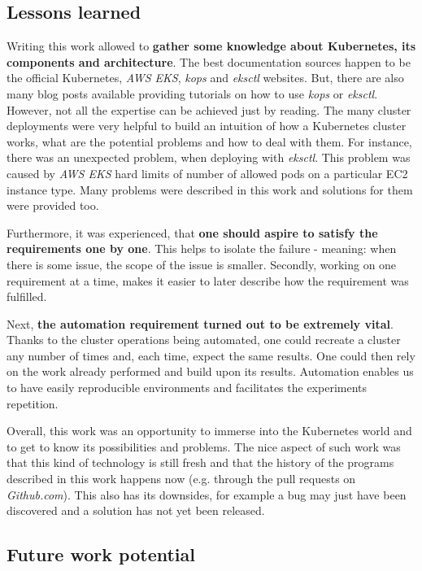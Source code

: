 \subsection{Lessons learned}

Writing this work allowed to \textbf{gather some knowledge about Kubernetes, its components and architecture}. The best documentation sources happen to be the official Kubernetes, \textit{AWS EKS}, \textit{kops} and \textit{eksctl} websites. But, there are also many blog posts available providing tutorials on how to use \textit{kops} or \textit{eksctl}. However, not all the expertise can be achieved just by reading. The many cluster deployments were very helpful to build an intuition of how a Kubernetes cluster works, what are the potential problems and how to deal with them. For instance, there was an unexpected problem, when deploying with \textit{eksctl}. This problem was caused by \textit{AWS EKS} hard limits of number of  allowed pods on a particular EC2 instance type. Many problems were described in this work and solutions for them were provided too.

Furthermore, it was experienced, that \textbf{one should aspire to satisfy the requirements one by one}. This helps to isolate the failure - meaning: when there is some issue, the scope of the issue is smaller. Secondly, working on one requirement at a time, makes it easier to later describe how the requirement was fulfilled.

Next, \textbf{the automation requirement turned out to be extremely vital}. Thanks to the cluster operations being automated, one could recreate a cluster any number of times and, each time, expect the same results. One could then rely on the work already performed and build upon its results. Automation enables us to have easily reproducible environments and facilitates the experiments repetition.

Overall, this work was an opportunity to immerse into the Kubernetes world and to get to know its possibilities and problems. The nice aspect of such work was that this kind of technology is still fresh and that the history of the programs described in this work happens now (e.g. through the pull requests on \textit{Github.com}). This also has its downsides, for example a bug may just have been discovered and a solution has not yet been released.

\subsection{Future work potential}

